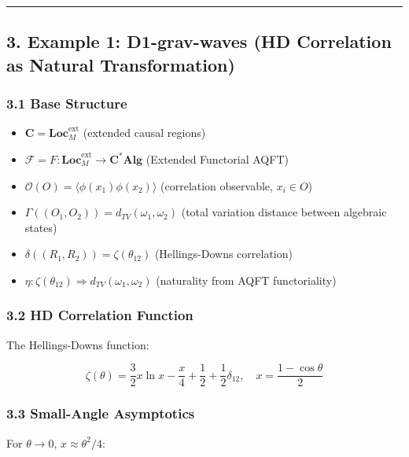 \documentclass[
]{article}
\providecommand{\tightlist}{%
  \setlength{\itemsep}{0pt}\setlength{\parskip}{0pt}}
\begin{document}
\begin{center}\rule{0.5\linewidth}{0.5pt}\end{center}

\subsection{3. Example 1: D1-grav-waves (HD Correlation as Natural
Transformation)}\label{example-1-d1-grav-waves-hd-correlation-as-natural-transformation}

\subsubsection{3.1 Base Structure}\label{base-structure}

\begin{itemize}
\tightlist
\item
  \(\mathbf{C} = \mathbf{Loc}_M^{\text{ext}}\) (extended causal regions)
\item
  \(\mathcal{F} = F: \mathbf{Loc}_M^{\text{ext}} \to \mathbf{C}^*\mathbf{Alg}\)
  (Extended Functorial AQFT)
\item
  \(\mathcal{O}(O) = \langle \phi(x_1)\phi(x_2) \rangle\) (correlation
  observable, \(x_i \in O\))
\item
  \(\Gamma((O_1, O_2)) = d_{TV}(\omega_1, \omega_2)\) (total variation
  distance between algebraic states)
\item
  \(\delta((R_1, R_2)) = \zeta(\theta_{12})\) (Hellings-Downs
  correlation)
\item
  \(\eta: \zeta(\theta_{12}) \Rightarrow d_{TV}(\omega_1, \omega_2)\)
  (naturality from AQFT functoriality)
\end{itemize}

\subsubsection{3.2 HD Correlation
Function}\label{hd-correlation-function}

The Hellings-Downs function:

\[\zeta(\theta) = \frac{3}{2} x \ln x - \frac{x}{4} + \frac{1}{2} + \frac{1}{2}\delta_{12}, \quad x = \frac{1 - \cos\theta}{2}\]

\subsubsection{3.3 Small-Angle
Asymptotics}\label{small-angle-asymptotics}

For \(\theta \to 0\), \(x \approx \theta^2/4\):
\end{document}
